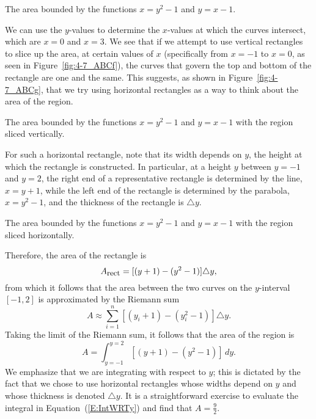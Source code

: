 \begin{marginfigure}[-6cm] %
\caption{The area bounded by the functions $x = y^2-1$ and $y = x-1$.} 
\label{fig:4-7_ABCe}
\end{marginfigure}

We can use the $y$-values to determine the $x$-values at which the curves intersect, which are $x=0$ and $x=3$. We see that if we attempt to use vertical rectangles to slice up the area, at certain values of $x$ (specifically from $x = -1$ to $x = 0$, as seen in Figure~\ref{fig:4-7_ABCf}), the curves that govern the top and bottom of the rectangle are one and the same.  This suggests, as shown in Figure~\ref{fig:4-7_ABCg}, that we try using horizontal rectangles as a way to think about the area of the region.

\begin{marginfigure}
\caption{The area bounded by the functions $x = y^2-1$ and $y = x-1$ with the region sliced vertically.} 
\label{fig:4-7_ABCf}
\end{marginfigure}

For such a horizontal rectangle, note that its width depends on $y$, the height at which the rectangle is constructed.  In particular, at a height $y$ between $y = -1$ and $y = 2$, the right end of a representative rectangle is determined by the line, $x = y+1$, while the left end of the rectangle is determined by the parabola, $x = y^2-1$, and the thickness of the rectangle is $\triangle y$.  

\begin{marginfigure}
\caption{The area bounded by the functions $x = y^2-1$ and $y = x-1$ with the region sliced horizontally.} 
\label{fig:4-7_ABCg}
\end{marginfigure}

Therefore, the area of the rectangle is
\[ A_{\mbox{\small{rect}}} = [(y+1) - (y^2-1)] \triangle y, \]
from which it follows that the area between the two curves on the $y$-interval $[-1,2]$ is approximated by the Riemann sum
\[ A \approx \sum_{i=1}^{n} [(y_i+1)-(y_i^2-1)] \triangle y.\]
Taking the limit of the Riemann sum, it follows that the area of the region is
\begin{equation} \label{E:IntWRTy} %
A = \int_{y=-1}^{y=2} [(y+1) - (y^2-1)] \, dy.
\end{equation}
We emphasize that we are integrating with respect to $y$; this is dictated by the fact that we chose to use horizontal rectangles whose widths depend on $y$ and whose thickness is denoted $\triangle y$.  It is a straightforward exercise to evaluate the integral in Equation~(\ref{E:IntWRTy}) and find that $A = \frac{9}{2}$.


